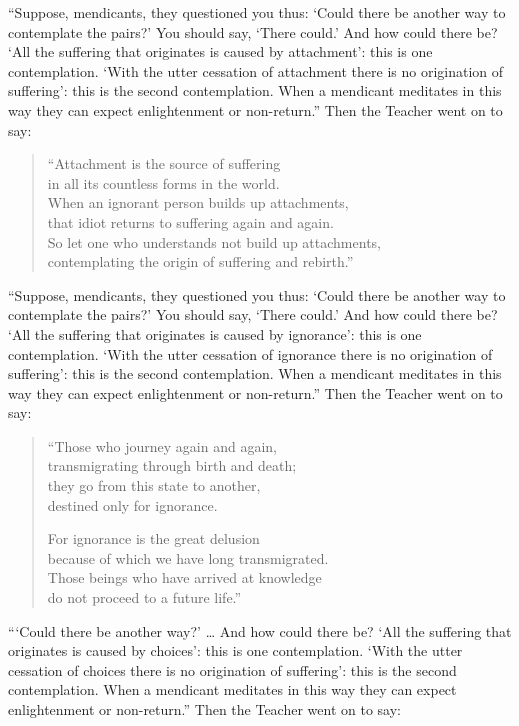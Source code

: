 \documentclass[12pt,openany]{book}%
\begin{document}
“Suppose, mendicants, they questioned you thus: ‘Could there be another way to contemplate the pairs?’ You should say, ‘There could.’ And how could there be? ‘All the suffering that originates is caused by attachment’: this is one contemplation. ‘With the utter cessation of attachment there is no origination of suffering’: this is the second contemplation. When a mendicant meditates in this way they can expect enlightenment or non-return.” Then the Teacher went on to say: 

\begin{verse}%
“Attachment is the source of suffering \\
in all its countless forms in the world. \\
When an ignorant person builds up attachments, \\
that idiot returns to suffering again and again. \\
So let one who understands not build up attachments, \\
contemplating the origin of suffering and rebirth.” 

%
\end{verse}

“Suppose, mendicants, they questioned you thus: ‘Could there be another way to contemplate the pairs?’ You should say, ‘There could.’ And how could there be? ‘All the suffering that originates is caused by ignorance’: this is one contemplation. ‘With the utter cessation of ignorance there is no origination of suffering’: this is the second contemplation. When a mendicant meditates in this way they can expect enlightenment or non-return.” Then the Teacher went on to say: 

\begin{verse}%
“Those who journey again and again, \\
transmigrating through birth and death; \\
they go from this state to another, \\
destined only for ignorance. 

For ignorance is the great delusion \\
because of which we have long transmigrated. \\
Those beings who have arrived at knowledge \\
do not proceed to a future life.” 

%
\end{verse}

“‘Could there be another way?’ … And how could there be? ‘All the suffering that originates is caused by choices’: this is one contemplation. ‘With the utter cessation of choices there is no origination of suffering’: this is the second contemplation. When a mendicant meditates in this way they can expect enlightenment or non-return.” Then the Teacher went on to say: 
\end{document}
